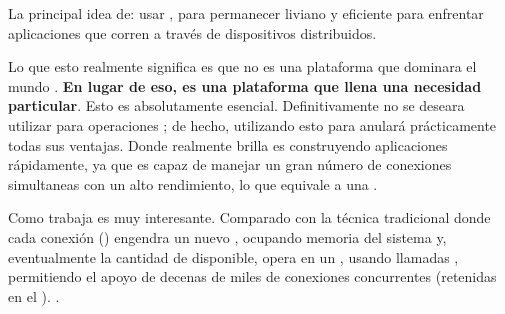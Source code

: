 
La principal idea de\nodejsNAME : usar \nonbloking, \eventdrivenPL {} para permanecer liviano y eficiente para enfrentar aplicaciones \dataintensive \realTimeINT que corren a través de dispositivos distribuidos.


Lo que esto realmente significa es que \nodejsNAME no es una plataforma \panaceaCPT que dominara el mundo \web \development. \textbf{En lugar de eso, es una plataforma que llena una necesidad particular}. Esto es absolutamente esencial. Definitivamente no se deseara utilizar \nodejsNAME para operaciones \cpuIntensivePC; de hecho, utilizando esto para \heavyComputationPC anulará prácticamente todas sus ventajas. Donde \nodejsNAME realmente brilla es construyendo aplicaciones \scalableQA  \network rápidamente, ya que es capaz de manejar un gran número de conexiones simultaneas con un alto rendimiento, lo que equivale a una \highScalabilityDB.

Como trabaja \underTheHoodCPT es muy interesante. Comparado con la técnica tradicional \webServingINT donde cada conexión (\requestINT) engendra un nuevo \threadPL, ocupando memoria \memoryRamPC del sistema y, eventualmente \maxingOutCPT la cantidad de \memoryRamPC disponible, \nodejsNAME opera en un \singleThreadPL, usando llamadas \nonbloking {}, permitiendo el apoyo de decenas de miles de conexiones concurrentes (retenidas en el \eventloopCPT). .


